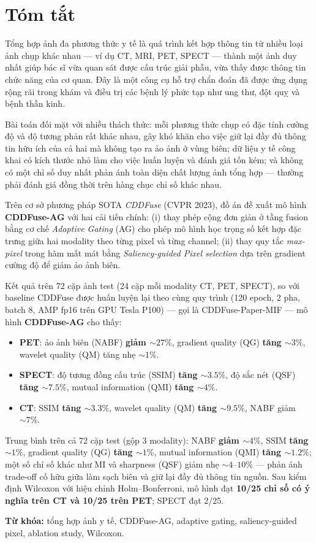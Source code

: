 \chapter*{Tóm tắt}

Tổng hợp ảnh đa phương thức y tế là quá trình kết hợp thông tin từ nhiều loại ảnh chụp khác nhau --- ví dụ CT, MRI, PET, SPECT --- thành một ảnh duy nhất giúp bác sĩ vừa quan sát được cấu trúc giải phẫu, vừa thấy được thông tin chức năng của cơ quan. Đây là một công cụ hỗ trợ chẩn đoán đã được ứng dụng rộng rãi trong khám và điều trị các bệnh lý phức tạp như ung thư, đột quỵ và bệnh thần kinh.

Bài toán đối mặt với nhiều thách thức: mỗi phương thức chụp có đặc tính cường độ và độ tương phản rất khác nhau, gây khó khăn cho việc giữ lại đầy đủ thông tin hữu ích của cả hai mà không tạo ra ảo ảnh ở vùng biên; dữ liệu y tế công khai có kích thước nhỏ làm cho việc huấn luyện và đánh giá tốn kém; và không có một chỉ số duy nhất phản ánh toàn diện chất lượng ảnh tổng hợp --- thường phải đánh giá đồng thời trên hàng chục chỉ số khác nhau.

Trên cơ sở phương pháp SOTA \emph{CDDFuse} \cite{zhao2023cddfuse} (CVPR 2023), đồ án đề xuất mô hình \textbf{CDDFuse-AG} với hai cải tiến chính: (i) thay phép cộng đơn giản ở tầng fusion bằng cơ chế \emph{Adaptive Gating} (AG) cho phép mô hình học trọng số kết hợp đặc trưng giữa hai modality theo từng pixel và từng channel; (ii) thay quy tắc \emph{max-pixel} trong hàm mất mát bằng \emph{Saliency-guided Pixel selection} dựa trên gradient cường độ để giảm ảo ảnh biên.

Kết quả trên 72 cặp ảnh test (24 cặp mỗi modality CT, PET, SPECT), so với baseline CDDFuse được huấn luyện lại theo cùng quy trình (120 epoch, 2 pha, batch 8, AMP fp16 trên GPU Tesla P100) --- gọi là CDDFuse-Paper-MIF --- mô hình \textbf{CDDFuse-AG} cho thấy:
\begin{itemize}\itemsep0pt
    \item \textbf{PET}: ảo ảnh biên (NABF) \textbf{giảm $\sim 27\%$}, gradient quality (QG) \textbf{tăng $\sim 3\%$}, wavelet quality (QM) tăng nhẹ $\sim 1\%$.
    \item \textbf{SPECT}: độ tương đồng cấu trúc (SSIM) \textbf{tăng $\sim 3.5\%$}, độ sắc nét (QSF) \textbf{tăng $\sim 7.5\%$}, mutual information (QMI) \textbf{tăng $\sim 4\%$}.
    \item \textbf{CT}: SSIM \textbf{tăng $\sim 3.3\%$}, wavelet quality (QM) \textbf{tăng $\sim 9.5\%$}, NABF giảm $\sim 7\%$.
\end{itemize}

Trung bình trên cả 72 cặp test (gộp 3 modality): NABF \textbf{giảm $\sim 4\%$}, SSIM \textbf{tăng $\sim 1\%$}, gradient quality (QG) \textbf{tăng $\sim 1\%$}, mutual information (QMI) \textbf{tăng $\sim 1.2\%$}; một số chỉ số khác như MI và sharpness (QSF) giảm nhẹ $\sim 4\text{--}10\%$ --- phản ánh trade-off cố hữu giữa làm sạch biên và giữ lại đầy đủ thông tin nguồn. Sau kiểm định Wilcoxon với hiệu chỉnh Holm--Bonferroni, mô hình đạt \textbf{10/25 chỉ số có ý nghĩa trên CT và 10/25 trên PET}; SPECT đạt 2/25.

\bigskip
\noindent\textbf{Từ khóa:} tổng hợp ảnh y tế, CDDFuse-AG, adaptive gating, saliency-guided pixel, ablation study, Wilcoxon.
